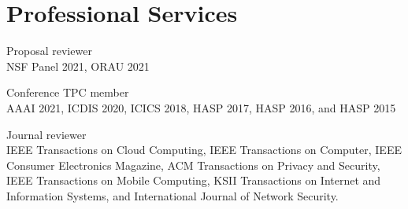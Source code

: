 
\section*{Professional Services}
\begin{compactitem}
    \item Proposal reviewer\\
    NSF Panel 2021, ORAU 2021
    \item Conference TPC member\\
    AAAI 2021, ICDIS 2020, ICICS 2018, HASP 2017, HASP 2016, and HASP 2015
    \item Journal reviewer \\
    IEEE Transactions on Cloud Computing, IEEE Transactions on Computer, IEEE Consumer Electronics Magazine, ACM Transactions on Privacy and Security, IEEE Transactions on Mobile Computing, KSII Transactions on Internet and Information Systems, and International Journal of Network Security.
\end{compactitem}
